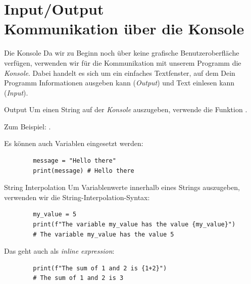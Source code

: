 \section{Input/Output \\ \footnotesize Kommunikation über die Konsole}


\begin{frame}

\begin{block}{Die Konsole}
\vspace{2pt}
Da wir zu Beginn noch über keine grafische Benutzeroberfläche verfügen, verwenden wir für die Kommunikation mit unserem Programm die \emph{Konsole}. 
Dabei handelt es sich um ein einfaches Textfenster, auf dem Dein Programm Informationen ausgeben kann (\emph{Output}) und Text einlesen kann (\emph{Input}). 
\end{block}

\end{frame}

\begin{fragile}[]
	
	\begin{block}{Output}
		\vspace{2pt}
		Um einen String auf der \emph{Konsole} auszugeben, verwende die Funktion . 
		
		
		Zum Beispiel: . 
		\pause
		
		\vspace{12pt}
		
		Es können auch Variablen eingesetzt werden: 
		\begin{verbatim}
		message = "Hello there"
		print(message) # Hello there
		\end{verbatim}
		
	\end{block}
	
\end{fragile}

\begin{fragile}[]
	
	\begin{block}{String Interpolation}
		\vspace{2pt}
		Um Variablenwerte innerhalb eines Strings auszugeben, verwenden wir die String-Interpolation-Syntax:
		\begin{verbatim}
		my_value = 5
		print(f"The variable my_value has the value {my_value}")
		# The variable my_value has the value 5
		\end{verbatim}
		
		\pause
		
		\vspace{12pt}
		
		Das geht auch als \textit{inline expression}: 
		\begin{verbatim}
		print(f"The sum of 1 and 2 is {1+2}")
		# The sum of 1 and 2 is 3
		\end{verbatim}
		
	\end{block}
	
\end{fragile}

